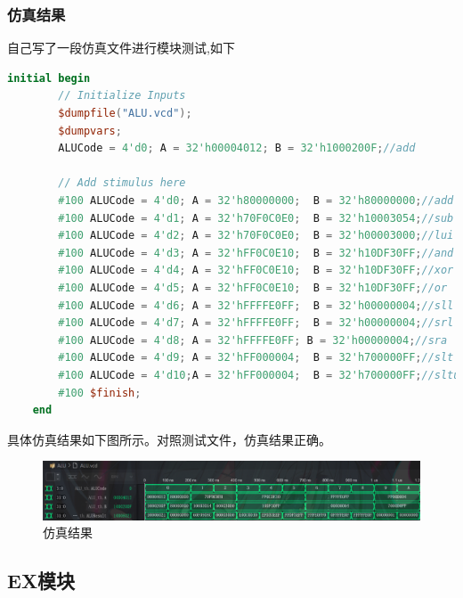 \documentclass[12pt,hyperref,a4paper,UTF8]{ctexart}
\begin{document}
\newpage

\subsubsection*{\Large 仿真结果}
\normalsize

自己写了一段仿真文件进行模块测试,如下

\begin{lstlisting}[language=Verilog,caption=ALU仿真文件]
	initial begin
		// Initialize Inputs
		$dumpfile("ALU.vcd");
 		$dumpvars;
		ALUCode = 4'd0; A = 32'h00004012; B = 32'h1000200F;//add
		      
		// Add stimulus here
		#100 ALUCode = 4'd0; A = 32'h80000000;	B = 32'h80000000;//add
		#100 ALUCode = 4'd1; A = 32'h70F0C0E0;	B = 32'h10003054;//sub
		#100 ALUCode = 4'd2; A = 32'h70F0C0E0;	B = 32'h00003000;//lui
		#100 ALUCode = 4'd3; A = 32'hFF0C0E10;	B = 32'h10DF30FF;//and
		#100 ALUCode = 4'd4; A = 32'hFF0C0E10;	B = 32'h10DF30FF;//xor
		#100 ALUCode = 4'd5; A = 32'hFF0C0E10;	B = 32'h10DF30FF;//or
		#100 ALUCode = 4'd6; A = 32'hFFFFE0FF;	B = 32'h00000004;//sll
		#100 ALUCode = 4'd7; A = 32'hFFFFE0FF;	B = 32'h00000004;//srl
		#100 ALUCode = 4'd8; A = 32'hFFFFE0FF; B = 32'h00000004;//sra
		#100 ALUCode = 4'd9; A = 32'hFF000004;	B = 32'h700000FF;//slt
		#100 ALUCode = 4'd10;A = 32'hFF000004;	B = 32'h700000FF;//sltu
		#100 $finish;
	end
\end{lstlisting}


    具体仿真结果如下图所示。对照测试文件，仿真结果正确。
    \begin{figure}[H]
        \centering
        \includegraphics[width=1\textwidth]{figures/fig/sim5.png}
        \caption{仿真结果}
    \end{figure}

  \newpage











\subsection{EX模块}
\end{document}
